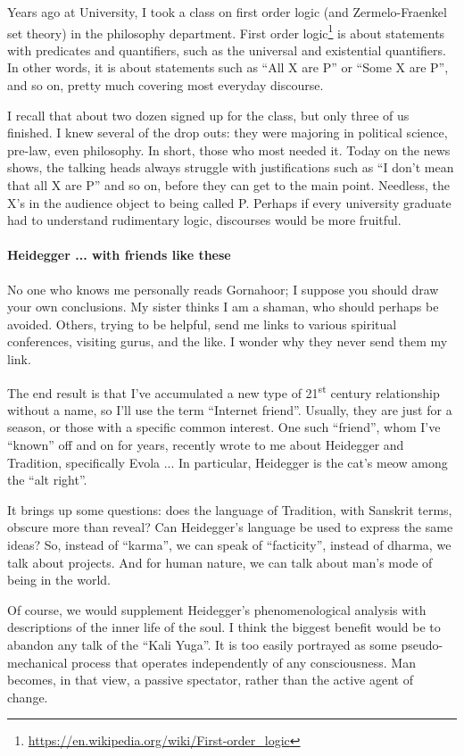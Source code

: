 Years ago at University, I took a class on first order logic (and Zermelo-Fraenkel set theory) in the philosophy department. First order logic\footnote{\url{https://en.wikipedia.org/wiki/First-order_logic}} is about statements with predicates and quantifiers, such as the universal and existential quantifiers. In other words, it is about statements such as ``All X are P'' or ``Some X are P'', and so on, pretty much covering most everyday discourse.

I recall that about two dozen signed up for the class, but only three of us finished. I knew several of the drop outs: they were majoring in political science, pre-law, even philosophy. In short, those who most needed it. Today on the news shows, the talking heads always struggle with justifications such as ``I don't mean that all X are P'' and so on, before they can get to the main point. Needless, the X's in the audience object to being called P. Perhaps if every university graduate had to understand rudimentary logic, discourses would be more fruitful.

\paragraph{Heidegger ... with friends like these}

No one who knows me personally reads Gornahoor; I suppose you should draw your own conclusions. My sister thinks I am a shaman, who should perhaps be avoided. Others, trying to be helpful, send me links to various spiritual conferences, visiting gurus, and the like. I wonder why they never send them my link.

The end result is that I've accumulated a new type of 21\textsuperscript{st} century relationship without a name, so I'll use the term ``Internet friend''. Usually, they are just for a season, or those with a specific common interest. One such ``friend'', whom I've ``known'' off and on for years, recently wrote to me about Heidegger and Tradition, specifically Evola ... In particular, Heidegger is the cat's meow among the ``alt right''.

It brings up some questions: does the language of Tradition, with Sanskrit terms, obscure more than reveal? Can Heidegger's language be used to express the same ideas? So, instead of ``karma'', we can speak of ``facticity'', instead of dharma, we talk about projects. And for human nature, we can talk about man's mode of being in the world.

Of course, we would supplement Heidegger's phenomenological analysis with descriptions of the inner life of the soul. I think the biggest benefit would be to abandon any talk of the ``Kali Yuga''. It is too easily portrayed as some pseudo-mechanical process that operates independently of any consciousness. Man becomes, in that view, a passive spectator, rather than the active agent of change.

